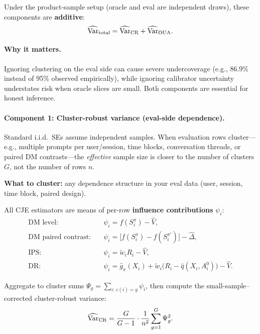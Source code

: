 Under the product-sample setup (oracle and eval are independent draws), these components are \textbf{additive}:
\begin{equation}
\widehat{\operatorname{Var}}_{\text{total}} = \widehat{\operatorname{Var}}_{\text{CR}} + \widehat{\operatorname{Var}}_{\text{OUA}}.
\end{equation}

\paragraph{Why it matters.} Ignoring clustering on the eval side can cause severe undercoverage (e.g., 86.9\% instead of 95\% observed empirically), while ignoring calibrator uncertainty understates risk when oracle slices are small. Both components are essential for honest inference.

\paragraph{Component 1: Cluster-robust variance (eval-side dependence).}

Standard i.i.d.\ SEs assume independent samples. When evaluation rows cluster---e.g., multiple prompts per user/session, time blocks, conversation threads, or paired DM contrasts---the \emph{effective} sample size is closer to the number of clusters $G$, not the number of rows $n$.

\textbf{What to cluster:} any dependence structure in your eval data (user, session, time block, paired design).

All CJE estimators are means of per-row \textbf{influence contributions} $\psi_i$:
\begin{align*}
\text{DM level:} \quad &\psi_i = f(S_i^\pi) - \hat{V}, \\
\text{DM paired contrast:} \quad &\psi_i = \bigl[f(S_i^\pi) - f(S_i^{\pi'})\bigr] - \widehat{\Delta}, \\
\text{IPS:} \quad &\psi_i = \tilde{w}_i R_i - \hat{V}, \\
\text{DR:} \quad &\psi_i = \hat{g}_\pi(X_i) + \tilde{w}_i\bigl(R_i - \hat{q}(X_i, A_i^0)\bigr) - \hat{V}.
\end{align*}

Aggregate to cluster sums $\Psi_g = \sum_{i:\, c(i)=g} \psi_i$, then compute the small-sample--corrected cluster-robust variance:
\begin{equation}
\widehat{\operatorname{Var}}_{\text{CR}} = \frac{G}{G-1} \cdot \frac{1}{n^2} \sum_{g=1}^G \Psi_g^2.
\end{equation}

